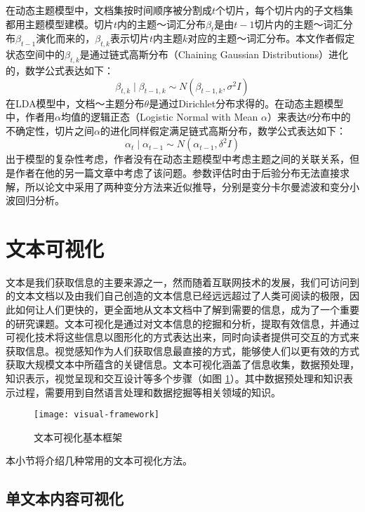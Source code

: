 在动态主题模型中，文档集按时间顺序被分割成$t$个切片，每个切片内的子文档集都用主题模型建模。切片$t$内的主题～词汇分布$\beta_t$是由$t-1$切片内的主题～词汇分布$\beta_{t-1}$演化而来的，$\beta_{t,k}$表示切片$t$内主题$k$对应的主题～词汇分布。本文作者假定状态空间中的$\beta_{t,k}$是通过链式高斯分布（Chaining Gaussian Distributions）进化的，数学公式表达如下：
$$
\beta_{t,k} \mid \beta_{t-1,k} \sim N \left( \beta_{t-1,k}, \sigma^2 I \right)
$$
在LDA模型中，文档～主题分布$\theta$是通过Dirichlet分布求得的。在动态主题模型中，作者用$\alpha$均值的逻辑正态（Logistic Normal with Mean $\alpha$）来表达$\theta$分布中的不确定性，切片之间$\alpha$的进化同样假定满足链式高斯分布，数学公式表达如下：
$$
\alpha_t \mid \alpha_{t-1} \sim N \left( \alpha_{t-1}, \delta ^2 I \right)
$$
出于模型的复杂性考虑，作者没有在动态主题模型中考虑主题之间的关联关系，但是作者在他的另一篇文章\cite{lafferty2005correlated}中考虑了该问题。参数评估时由于后验分布无法直接求解，所以论文中采用了两种变分方法来近似推导，分别是变分卡尔曼滤波和变分小波回归分析。

\section{文本可视化}
文本是我们获取信息的主要来源之一，然而随着互联网技术的发展，我们可访问到的文本文档以及由我们自己创造的文本信息已经远远超过了人类可阅读的极限，因此如何让人们更快的，更全面地从文本文档中了解到需要的信息，成为了一个重要的研究课题。文本可视化是通过对文本信息的挖掘和分析，提取有效信息，并通过可视化技术将这些信息以图形化的方式表达出来，同时向读者提供可交互的方式来获取信息。视觉感知作为人们获取信息最直接的方式，能够使人们以更有效的方式获取大规模文本中所蕴含的关键信息。文本可视化涵盖了信息收集，数据预处理，知识表示，视觉呈现和交互设计等多个步骤（如图 \ref{fig:visual-framework}）。其中数据预处理和知识表示过程，需要用到自然语言处理和数据挖掘等相关领域的知识。
\begin{figure}[htb]
    \centering%
    \texttt{[image: visual-framework]}
    \caption{文本可视化基本框架}
    \label{fig:visual-framework}
\end{figure}
本小节将介绍几种常用的文本可视化方法。

\subsection{单文本内容可视化}
